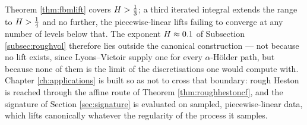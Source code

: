 \begin{remark}\label{rem:H01outside}
Theorem \ref{thm:fbmlift} covers $H>\tfrac13$; a third iterated integral extends the range to
$H>\tfrac14$ and no further, the piecewise-linear lifts failing to converge at any number of
levels below that. The exponent $H\approx0.1$ of Subsection \ref{subsec:roughvol} therefore
lies outside the canonical construction --- not because no lift exists, since Lyons--Victoir
\cite{lyonsvictoir2007} supply one for every $\alpha$-Hölder path, but because none of them is the
limit of the discretisations one would compute with. Chapter \ref{ch:applications} is built so as
not to cross that boundary: rough Heston is reached through the affine route of Theorem
\ref{thm:roughhestoncf}, and the signature of Section \ref{sec:signature} is evaluated on sampled,
piecewise-linear data, which lifts canonically whatever the regularity of the process it samples.
\end{remark}


